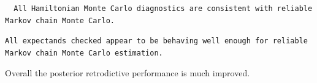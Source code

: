 \documentclass[
  letterpaper,
  DIV=11,
  numbers=noendperiod]{scrartcl}
\newenvironment{Shaded}{\begin{snugshade}}{\end{snugshade}}
\newcommand{\AttributeTok}[1]{\textcolor[rgb]{0.40,0.45,0.13}{#1}}
\newcommand{\ConstantTok}[1]{\textcolor[rgb]{0.56,0.35,0.01}{#1}}
\newcommand{\FunctionTok}[1]{\textcolor[rgb]{0.28,0.35,0.67}{#1}}
\newcommand{\NormalTok}[1]{\textcolor[rgb]{0.00,0.23,0.31}{#1}}
\newcommand{\OtherTok}[1]{\textcolor[rgb]{0.00,0.23,0.31}{#1}}
\newcommand{\SpecialCharTok}[1]{\textcolor[rgb]{0.37,0.37,0.37}{#1}}
\newcommand{\StringTok}[1]{\textcolor[rgb]{0.13,0.47,0.30}{#1}}
\begin{document}
\begin{verbatim}
  All Hamiltonian Monte Carlo diagnostics are consistent with reliable
Markov chain Monte Carlo.
\end{verbatim}

\begin{Shaded}
\end{Shaded}

\begin{verbatim}
All expectands checked appear to be behaving well enough for reliable
Markov chain Monte Carlo estimation.
\end{verbatim}

Overall the posterior retrodictive performance is much improved.
\end{document}
